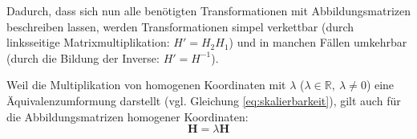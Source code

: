 {\noindent}Dadurch, dass sich nun alle benötigten Transformationen mit Abbildungsmatrizen beschreiben lassen, werden Transformationen simpel verkettbar (durch linksseitige Matrixmultiplikation: $H'=H_2H_1$) und in manchen Fällen umkehrbar (durch die Bildung der Inverse: $H'=H^{-1}$).\kleinerabstand

{\noindent}Weil die Multiplikation von homogenen Koordinaten mit $\lambda$ ($\lambda\in\mathbb{R},\:\lambda\not=0$) eine Äquivalenzumformung darstellt (vgl. Gleichung \ref{eq:skalierbarkeit}), gilt auch für die Abbildungsmatrizen homogener Koordinaten:
\begin{equation}\label{eq:matrix_skalierbarkeit}
	\boldsymbol{H} = \lambda\boldsymbol{H}
\end{equation}



